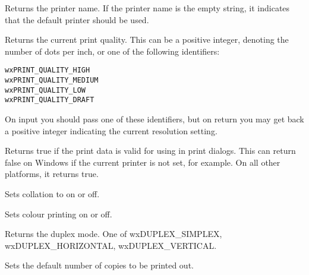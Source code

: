 Returns the printer name. If the printer name is the empty string, it indicates that the default
printer should be used.

\label{wxprintdatagetquality}


Returns the current print quality. This can be a positive integer, denoting the number of dots per inch, or
one of the following identifiers:

\begin{verbatim}
wxPRINT_QUALITY_HIGH
wxPRINT_QUALITY_MEDIUM
wxPRINT_QUALITY_LOW
wxPRINT_QUALITY_DRAFT
\end{verbatim}

On input you should pass one of these identifiers, but on return you may get back a positive integer
indicating the current resolution setting.

\label{wxprintdataok}


Returns true if the print data is valid for using in print dialogs.
This can return false on Windows if the current printer is not set, for example.
On all other platforms, it returns true.

\label{wxprintdatasetcollate}


Sets collation to on or off.

\label{wxprintdatasetcolour}


Sets colour printing on or off.

\label{wxprintdatasetduplex}


Returns the duplex mode. One of wxDUPLEX\_SIMPLEX, wxDUPLEX\_HORIZONTAL, wxDUPLEX\_VERTICAL.

\label{wxprintdatasetnocopies}


Sets the default number of copies to be printed out.

\label{wxprintdatasetorientation}

